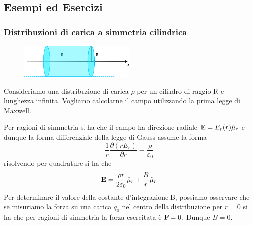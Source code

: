 \subsection{Esempi ed Esercizi}

\subsubsection{Distribuzioni di carica a simmetria cilindrica}

\begin{figure}
  \centering
  \includegraphics[width=0.5\textwidth]{images/cilindro}
\end{figure}

Consideriamo una distribuzione di carica $\rho$ per un cilindro di raggio R e lunghezza infinita. Vogliamo calcolarne il campo utilizzando la prima legge di Maxwell.

Per ragioni di simmetria si ha che il campo ha direzione radiale $\bold{E} = E_r(r)\hat{\mu}_r$ e dunque la forma differenziale della legge di Gauss assume la forma 
\begin{equation*}
	\frac{1}{r} \frac{\partial (r E_r)}{\partial r} = \frac{\rho}{\varepsilon_0}
\end{equation*}
risolvendo per quadrature si ha che 
\begin{equation*}
	\bold{E} = \frac{\rho r}{2 \varepsilon_0}\hat{\mu}_{r} +\frac{B}{r}\hat{\mu}_r
\end{equation*}
Per determinare il valore della costante d'integrazione B, possiamo osservare che se misuriamo la forza su una carica $q_0$ nel centro della distribuzione per $r = 0$ si ha che per ragioni di simmetria la forza esercitata \`e $\bold{F} = 0$. Dunque $B=0$.
\\

